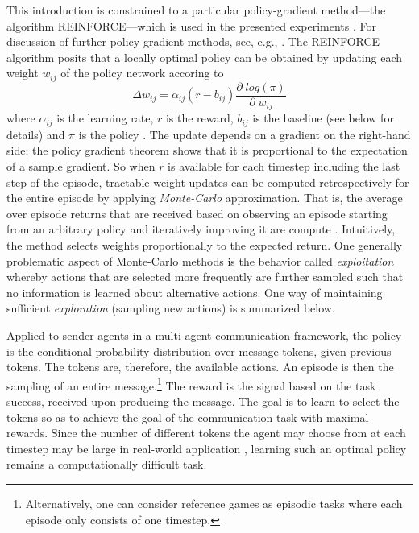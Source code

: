 This introduction is constrained to a particular policy-gradient method---the algorithm REINFORCE---which is used in the presented experiments \parencite{williams1992simple}. For discussion of further policy-gradient methods, see, e.g., \cite{sutton2018reinforcement}. 
The REINFORCE algorithm posits that a locally optimal policy can be obtained by updating each weight $w_{ij}$ of the policy network accoring to 
\begin{equation}
\label{eq:reinforce}
\Delta w_{ij} = \alpha_{ij} (r - b_{ij}) \frac{\partial \; log(\pi)}{\partial \; w_{ij}}
\end{equation}
where $\alpha_{ij}$ is the learning rate, $r$ is the reward, $b_{ij}$ is the baseline (see below for details) and $\pi$ is the policy \parencite[cf.][p.~234]{williams1992simple}. The update depends on a gradient on the right-hand side; the policy gradient theorem shows that it is proportional to the expectation of a sample gradient. So when $r$ is available for each timestep including the last step of the episode, tractable weight updates can be computed retrospectively for the entire episode by applying \textit{Monte-Carlo} approximation. That is, the average over episode returns that are received based on observing an episode starting from an arbitrary policy and iteratively improving it are compute \parencite{sutton2018reinforcement}. Intuitively, the method selects weights proportionally to the expected return. One generally problematic aspect of Monte-Carlo methods is the behavior called \textit{exploitation} whereby actions that are selected more frequently are further sampled such that no information is learned about alternative actions. One way of maintaining sufficient \textit{exploration} (sampling new actions) is summarized below. 

Applied to sender agents in a multi-agent communication framework, the policy is the conditional probability distribution over message tokens, given previous tokens. The tokens are, therefore, the available actions. An episode is then the sampling of an entire message.\footnote{Alternatively, one can consider reference games as episodic tasks where each episode only consists of one timestep.} The reward is the signal based on the task success, received upon producing the message. The goal is to learn to select the tokens so as to achieve the goal of the communication task with maximal rewards. Since the number of different tokens the agent may choose from at each timestep may be large in real-world application \parencite[cf.][]{he2015deep}, learning such an optimal policy remains a computationally difficult task.

